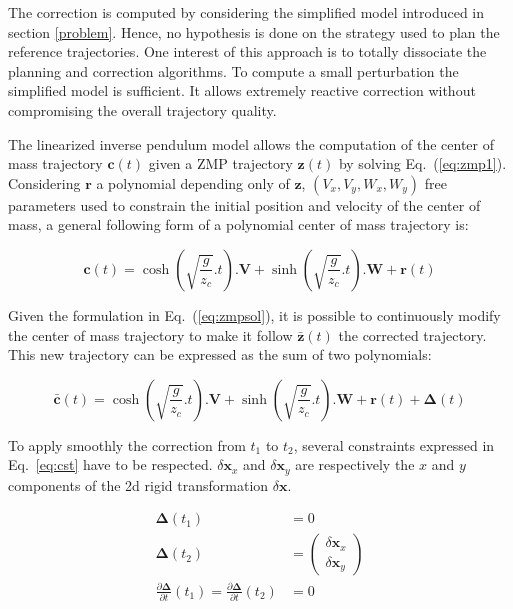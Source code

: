 The correction is computed by considering the simplified model
introduced in section \ref{problem}. Hence, no hypothesis is done on
the strategy used to plan the reference trajectories. One interest of
this approach is to totally dissociate the planning and correction
algorithms. To compute a small perturbation the simplified model is
sufficient. It allows extremely reactive correction without
compromising the overall trajectory quality.


The linearized inverse pendulum model allows the computation of the
center of mass trajectory $\mathbf{c}(t)$ given a ZMP trajectory
$\mathbf{z}(t)$ by solving Eq.~(\ref{eq:zmp1}). Considering $\mathbf{r}$ a
polynomial depending only of $\mathbf{z}$, $(V_x, V_y, W_x, W_y)$ free
parameters used to constrain the initial position and velocity of the
center of mass, a general following form of a polynomial center of
mass trajectory is:

\begin{equation} \label{eq:zmpsol}
  \mathbf{c}(t) = \cosh(\sqrt{\frac{g}{z_c}}.t) . \mathbf{V} + \sinh(\sqrt{\frac{g}{z_c}}.t) . \mathbf{W} + \mathbf{r}(t)
\end{equation}

Given the formulation in Eq.~(\ref{eq:zmpsol}), it is possible to
continuously modify the center of mass trajectory to make it follow
\mbox{$\bar{\mathbf{z}}(t)$} the corrected trajectory. This new
trajectory can be expressed as the sum of two polynomials:

\begin{equation} \label{eq:zmpsolcor}
  \bar{\mathbf{c}}(t) = \cosh(\sqrt{\frac{g}{z_c}}.t) . \mathbf{V} +
  \sinh(\sqrt{\frac{g}{z_c}}.t) . \mathbf{W} + \mathbf{r}(t) + \mathbf{\Delta}(t)
\end{equation}

To apply smoothly the correction from $t_1$ to $t_2$, several
constraints expressed in Eq.~\ref{eq:cst} have to be respected.
$\delta \mathbf{x}_x$ and $\delta \mathbf{x}_y$ are respectively the
$x$ and $y$ components of the 2d rigid transformation $\delta
\mathbf{x}$.

\begin{equation}
\begin{aligned}
  \mathbf{\Delta}(t_1) &= 0\\
  \mathbf{\Delta}(t_2) &= \left(
  \begin{array}{c}
    \delta \mathbf{x}_x \\
    \delta \mathbf{x}_y
  \end{array}
  \right)\\
  \frac{\partial \mathbf{\Delta}}{\partial t}(t_1) = \frac{\partial
    \mathbf{\Delta}}{\partial t}(t_2) &= 0
\end{aligned}
\label{eq:cst}
\end{equation}

